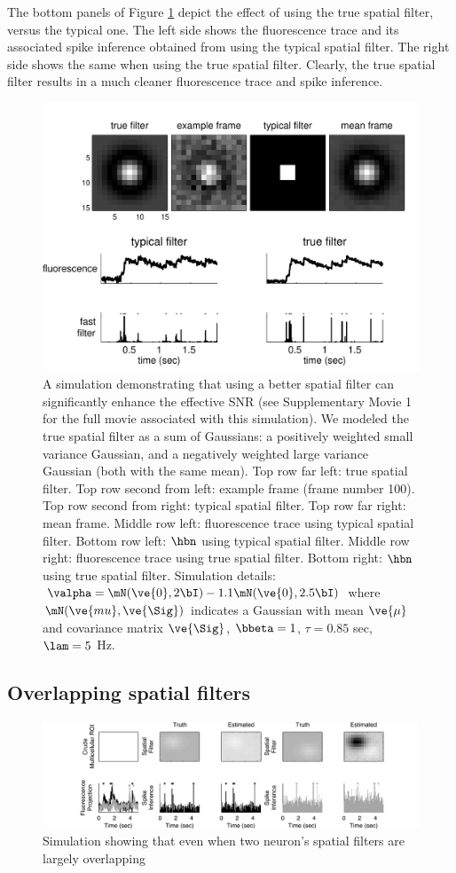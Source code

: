 The bottom panels of Figure \ref{fig:spatial} depict the effect of using the true spatial filter, versus the typical one. The left side shows the fluorescence trace and its associated spike inference obtained from using the typical spatial filter.  The right side shows the same when using the true spatial filter.  Clearly, the true spatial filter results in a much cleaner fluorescence trace and spike inference.  


\begin{figure}[h!]
\centering \includegraphics[width=.9\linewidth]{../figs/spatial2}
\caption{A simulation demonstrating that using a better spatial filter can significantly enhance the effective SNR (see Supplementary Movie 1 for the full movie associated with this simulation). We modeled the true spatial filter as a sum of Gaussians: a positively weighted small variance Gaussian, and a negatively weighted large variance Gaussian (both with the same mean).  Top row far left: true spatial filter.  Top row second from left: example frame (frame number 100). Top row second from right: typical spatial filter.   Top row far right: mean frame.  Middle row left: fluorescence trace using typical spatial filter. Bottom row left: $\hbn$ using typical spatial filter.  Middle row right: fluorescence trace using true spatial filter.  Bottom right: $\hbn$ using true spatial filter. Simulation details: $\valpha=\mN(\ve{0},2 \bI)-1.1 \mN(\ve{0},2.5 \bI)$ where $\mN(\ve{mu},\ve{\Sig})$ indicates a Gaussian with mean $\ve{\mu}$ and covariance matrix $\ve{\Sig}$, $\bbeta=1$, $\tau=0.85$ sec, $\lam=5$ Hz.} \label{fig:spatial} 
\end{figure}




\subsection{Overlapping spatial filters}

\begin{figure}[h!]
\centering \includegraphics[width=.9\linewidth]{../figs/spatial_multi}
\caption{Simulation showing that even when two neuron's spatial filters are largely overlapping} \label{fig:spatial_multi}
\end{figure}

